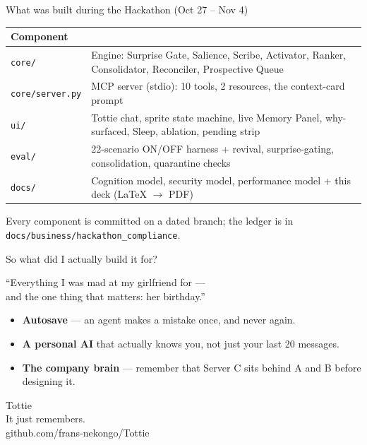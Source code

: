 \documentclass[aspectratio=169,10pt]{beamer}
\begin{document}
\begin{frame}{What was built during the Hackathon (Oct 27 -- Nov 4)}
  \begin{tabularx}{\textwidth}{@{}l X@{}}
    \toprule
    Component & \\
    \midrule
    \texttt{core/} & Engine: Surprise Gate, Salience, Scribe, Activator, Ranker, Consolidator, Reconciler, Prospective Queue \\
    \texttt{core/server.py} & MCP server (stdio): 10 tools, 2 resources, the context-card prompt \\
    \texttt{ui/} & Tottie chat, sprite state machine, live Memory Panel, why-surfaced, Sleep, ablation, pending strip \\
    \texttt{eval/} & 22-scenario ON/OFF harness + revival, surprise-gating, consolidation, quarantine checks \\
    \texttt{docs/} & Cognition model, security model, performance model + this deck (LaTeX $\rightarrow$ PDF) \\
    \bottomrule
  \end{tabularx}
  \vfill
  \centering\small Every component is committed on a dated branch; the ledger is in
  \texttt{docs/business/hackathon\_compliance}.
\end{frame}

\begin{frame}{So what did I actually build it for?}
  \begin{center}
    \Large ``Everything I was mad at my girlfriend for ---\\ and the one thing that matters: her birthday.''
  \end{center}
  \vfill
  \begin{itemize}
    \item \textbf{Autosave} --- an agent makes a mistake once, and never again.
    \item \textbf{A personal AI} that actually knows you, not just your last 20 messages.
    \item \textbf{The company brain} --- remember that Server C sits behind A and B before designing it.
  \end{itemize}
\end{frame}

\begin{frame}[plain]
  \begin{center}
    \Huge Tottie\\[3mm]
    \large It just remembers.\\[6mm]
    \normalsize github.com/frans-nekongo/Tottie
  \end{center}
\end{frame}
\end{document}
